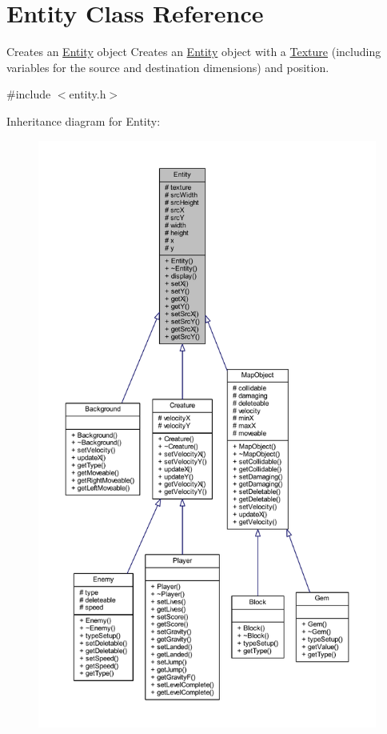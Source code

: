 \hypertarget{class_entity}{\section{Entity Class Reference}
\label{class_entity}
}


Creates an \hyperlink{class_entity}{Entity} object Creates an \hyperlink{class_entity}{Entity} object with a \hyperlink{class_texture}{Texture} (including variables for the source and destination dimensions) and position.  




{\ttfamily \#include $<$entity.\+h$>$}



Inheritance diagram for Entity\+:
\nopagebreak
\begin{figure}[H]
\begin{center}
\leavevmode
\includegraphics[height=550pt]{class_entity__inherit__graph}
\end{center}
\end{figure}


